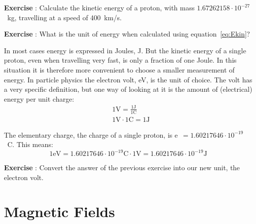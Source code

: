 \documentclass[12pt,a4paper]{article}
\numberwithin{equation}{section}
\numberwithin{figure}{section}
\newcounter{Exercise}
\numberwithin{table}{section}
\begin{document}
\begin{shaded}
\textbf{Exercise \theExercise {}} : Calculate the kinetic energy of a proton, with mass $1.67262158 \cdot 10^{-27}$~kg, travelling at a speed of 400~km/s.\end{shaded}

\begin{shaded}
\textbf{Exercise \theExercise {}} : What is the unit of energy when calculated using equation~\ref{eq:Ekin}?\end{shaded}

In most cases energy is expressed in Joules, J. But the kinetic energy of a single proton, even when travelling very fast, is only a fraction of one Joule. In this situation it is therefore more convenient to choose a smaller measurement of energy. In particle physics the electron volt, eV, is the unit of choice. The volt has a very specific definition, but one way of looking at it is the amount of (electrical) energy per unit charge:
\begin{equation}\begin{aligned}
& 1\mbox{V} = \frac{1\mbox{J}}{1\mbox{C}} \\
& 1\mbox{V} \cdot 1\mbox{C} = 1\mbox{J}
\end{aligned}\end{equation}

The elementary charge, the charge of a single proton, is e~$= 1.60217646 \cdot 10^{-19}$~C. This means:
\begin{equation}
1\mbox{eV}=1.60217646 \cdot 10^{-19} \mbox{C} \cdot 1\mbox{V} = 1.60217646 \cdot 10^{-19}\mbox{J}
\end{equation}

\begin{shaded}
\textbf{Exercise \theExercise {}} : Convert the answer of the previous exercise into our new unit, the electron volt.\end{shaded}

\section{Magnetic Fields}
\end{document}
